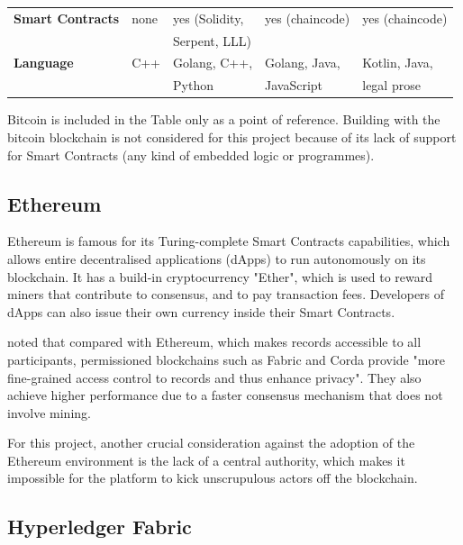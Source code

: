 \begin{table}[!ht]
\begin{tabularx}{\textwidth}{>{\bfseries}lXXXX}
		\midrule
		Smart Contracts & none                   & yes (Solidity,                    & yes (chaincode)               & yes (chaincode)       \\
		                &                        & Serpent, LLL)                                                                             \\
		\hline
		Language        & C++                    & Golang, C++,                      & Golang, Java,                 & Kotlin, Java,         \\
		                &                        & Python                            & JavaScript                    & legal prose           \\
		\bottomrule
	\end{tabularx}
\end{table}

Bitcoin is included in the Table only as a point of reference. Building with the bitcoin
blockchain is not considered for this project because of its lack of support for Smart
Contracts (any kind of embedded logic or programmes).

\subsection*{Ethereum}

Ethereum is famous for its Turing-complete Smart Contracts capabilities, which allows entire
decentralised applications (dApps) to run autonomously on its blockchain. It has a build-in cryptocurrency
"Ether", which is used to reward miners that contribute to consensus, and to pay transaction fees.
Developers of dApps can also issue their own currency inside their Smart Contracts.

\citet[p.3-4]{valenta2017comparison} noted that compared with Ethereum, which makes records accessible
to all participants, permissioned blockchains such as Fabric and Corda provide "more fine-grained access
control to records and thus enhance privacy".
They also achieve higher performance due to a faster consensus mechanism that does not involve mining.

For this project, another crucial consideration against the adoption of the Ethereum environment is the
lack of a central authority, which makes it impossible for the platform to kick unscrupulous actors off
the blockchain.

\subsection*{Hyperledger Fabric}


